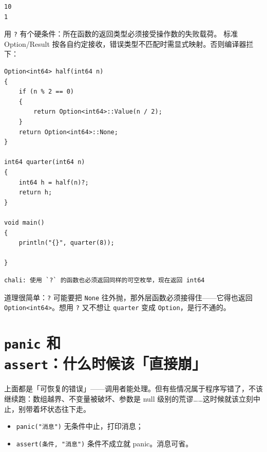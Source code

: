 \par
\medskip
\begin{lstlisting}[style=out]
10
1
\end{lstlisting}
\par
\medskip

用 \texttt{?} 有个硬条件：所在函数的返回类型必须接受操作数的失败载荷。 标准 Option/Result 按各自约定接收，错误类型不匹配时需显式映射。否则编译器拦下：

\par
\medskip
\begin{lstlisting}[style=chali]
Option<int64> half(int64 n)
{
    if (n % 2 == 0)
    {
        return Option<int64>::Value(n / 2);
    }
    return Option<int64>::None;
}

int64 quarter(int64 n)
{
    int64 h = half(n)?;
    return h;
}

void main()
{
    println("{}", quarter(8));

}
\end{lstlisting}
\par
\medskip

\par
\medskip
\begin{lstlisting}[style=out]
chali: 使用 `?` 的函数也必须返回同样的可空枚举，现在返回 int64
\end{lstlisting}
\par
\medskip

道理很简单：\texttt{?} 可能要把 \texttt{None} 往外抛，那外层函数必须接得住——它得也返回 \texttt{Option<\allowbreak{}int64>\allowbreak{}}。想用 \texttt{?} 又不想让 \texttt{quarter} 变成 \texttt{Option}，是行不通的。

\section{\texttt{panic} 和 \texttt{assert}：什么时候该「直接崩」}

上面都是「可恢复的错误」——调用者能处理。但有些情况属于程序写错了，不该继续跑：数组越界、不变量被破坏、参数是 null 级别的荒谬……这时候就该立刻中止，别带着坏状态往下走。

\begin{itemize}

\item \texttt{panic(\allowbreak{}"消息")\allowbreak{}} 无条件中止，打印消息；

\item \texttt{assert(\allowbreak{}条件,\allowbreak{} "消息")\allowbreak{}} 条件不成立就 panic。消息可省。

\end{itemize}

